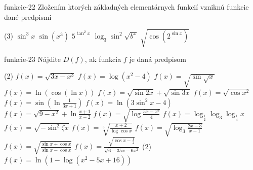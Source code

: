 \begin{defproblem}{funkcie-22}
Zložením ktorých základných elementárnych funkcií vzniknú funkcie dané predpismi
\begin{tasks}(3)
  \task $\sin^3 x$
  \task $\sin (x^3)$
  \task $5^{\tan^2 x}$
  \task $\log_3 \sin^2 \sqrt{b^x}$
  \task $\sqrt{\cos (2^{\sin x})}$
\end{tasks}
\end{defproblem}

\begin{defproblem}{funkcie-23}
Nájdite $D(f)$, ak funkcia $f$ je daná predpisom
\begin{tasks}(2)
  \task $f(x)=\sqrt{3x-x^3}$
  \task $f(x)=\log(x^2-4)$
  \task $f(x)=\sqrt{\sin \sqrt{x}}$
  \task $f(x)=\ln{(\cos (\ln x))}$
  \task $f(x)=\sqrt{\sin 2x}+\sqrt{\sin 3x}$
  \task $f(x)=\sqrt{\cos x^2}$
  \task $f(x)=\sin (\ln \frac{1}{3x+1})$
  \task $f(x)=\ln{(3\sin^2 x -4)}$
  \task $f(x)=\sqrt{9-x^2}+\ln \frac{x+1}{x-2}$
  \task $f(x)=\sqrt{\log \frac{5x-x^2}{4}}$
  \task $f(x)=\log_\frac{1}{2}\log_3 \log_\frac{1}{4} x$
  \task $f(x)=\sqrt{-\sin^2 \zeta x}$
  \task $f(x)=\sqrt[3]{\frac{x+2}{\log\cos x}}$
  \task $f(x)=\sqrt{\log_3 \frac{2x-3}{x-1}}$
  \task $f(x)=\sqrt{\frac{\sin x +\cos x}{\sin x -\cos x}}$
  \task $f(x)=\frac{\sqrt{\cos x -\frac{1}{2}}}{\sqrt{6-35x-6x^2}}$
  \task*(2) $f(x)=\ln{(1-\log (x^2-5x+16))}$
\end{tasks}
\end{defproblem}

